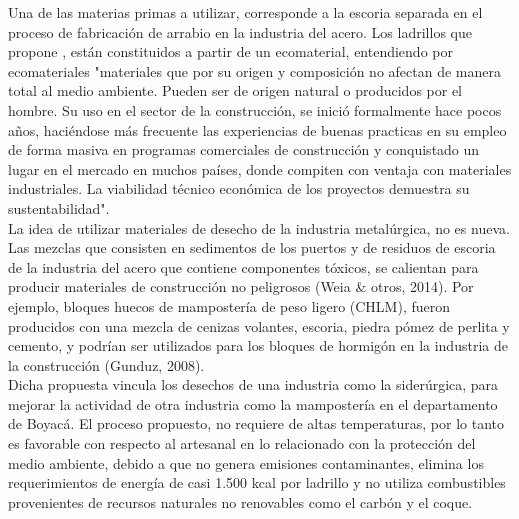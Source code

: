 \documentclass[12pt]{article}
\begin{document}
Una de las materias primas a utilizar, corresponde a la escoria separada en el proceso de fabricación de arrabio en la industria del acero. Los ladrillos que propone  \cite{quijano2014implementacion}, están constituidos a partir de un ecomaterial, entendiendo por ecomateriales "materiales que por su origen y composición no afectan de manera total al medio ambiente. Pueden ser de origen natural o producidos por el hombre. Su uso en el sector de la construcción, se inició formalmente hace pocos años, haciéndose más frecuente las experiencias de buenas practicas en su empleo de forma masiva en programas comerciales de construcción y conquistado un lugar en el mercado en muchos países, donde compiten con ventaja con materiales industriales. La viabilidad técnico económica de los proyectos demuestra su sustentabilidad".\\

La idea de utilizar materiales de desecho de la industria metalúrgica, no es nueva. Las mezclas que consisten en sedimentos de los puertos y de residuos de escoria de la industria del acero que contiene componentes tóxicos, se calientan para producir materiales de construcción no peligrosos (Weia \& otros, 2014). Por ejemplo, bloques huecos de mampostería de peso ligero (CHLM), fueron producidos con una mezcla de cenizas volantes, escoria, piedra pómez de perlita y cemento, y podrían ser utilizados para los bloques de hormigón en la industria de la construcción (Gunduz, 2008).\\

Dicha propuesta vincula los desechos de una industria como la siderúrgica, para mejorar la actividad de otra industria como la mampostería en el departamento de Boyacá. El proceso propuesto, no requiere de altas temperaturas, por lo tanto es favorable con respecto al artesanal en lo relacionado con la protección del medio ambiente, debido a que no genera emisiones contaminantes, elimina los requerimientos de energía de casi 1.500 kcal por ladrillo y no utiliza combustibles provenientes de recursos naturales no renovables como el carbón y el coque.
\end{document}
